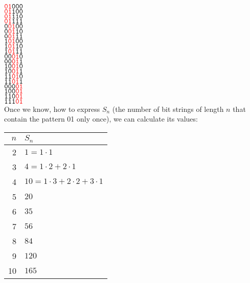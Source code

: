 \documentclass[jou]{apa6}
\begin{document}
$\mathtt{}\textcolor{red}{\mathtt{01}}\mathtt{000}$\\
$\mathtt{}\textcolor{red}{\mathtt{01}}\mathtt{100}$\\
$\mathtt{}\textcolor{red}{\mathtt{01}}\mathtt{110}$\\
$\mathtt{}\textcolor{red}{\mathtt{01}}\mathtt{111}$\\
$\mathtt{0}\textcolor{red}{\mathtt{01}}\mathtt{00}$\\
$\mathtt{0}\textcolor{red}{\mathtt{01}}\mathtt{10}$\\
$\mathtt{0}\textcolor{red}{\mathtt{01}}\mathtt{11}$\\
$\mathtt{1}\textcolor{red}{\mathtt{01}}\mathtt{00}$\\
$\mathtt{1}\textcolor{red}{\mathtt{01}}\mathtt{10}$\\
$\mathtt{1}\textcolor{red}{\mathtt{01}}\mathtt{11}$\\
$\mathtt{00}\textcolor{red}{\mathtt{01}}\mathtt{0}$\\
$\mathtt{00}\textcolor{red}{\mathtt{01}}\mathtt{1}$\\
$\mathtt{10}\textcolor{red}{\mathtt{01}}\mathtt{0}$\\
$\mathtt{10}\textcolor{red}{\mathtt{01}}\mathtt{1}$\\
$\mathtt{11}\textcolor{red}{\mathtt{01}}\mathtt{0}$\\
$\mathtt{11}\textcolor{red}{\mathtt{01}}\mathtt{1}$\\
$\mathtt{000}\textcolor{red}{\mathtt{01}}\mathtt{}$\\
$\mathtt{100}\textcolor{red}{\mathtt{01}}\mathtt{}$\\
$\mathtt{110}\textcolor{red}{\mathtt{01}}\mathtt{}$\\
$\mathtt{111}\textcolor{red}{\mathtt{01}}\mathtt{}$\\
 
Once we know, how to express $S_n$ (the number of bit strings
of length $n$ that contain the pattern 01 only once), we can calculate its values: 

\begin{tabular}{|r|l|}\hline
$n$ & $S_n$ \\ \hline
2 & $1 = 1 \cdot 1$ \\ \hline
3 & $4 = 1 \cdot 2 + 2 \cdot 1$ \\ \hline
4 & $10 = 1 \cdot 3 + 2 \cdot 2 + 3 \cdot 1$ \\ \hline
5 & $20$ \\ \hline
6 & $35$ \\ \hline
7 & $56$ \\ \hline
8 & $84$ \\ \hline
9 & $120$ \\ \hline
10 & $165$ \\ \hline
\end{tabular}
\end{document}
